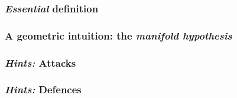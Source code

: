 \subsubsection{\textit{Essential} definition}
\subsubsection{A geometric intuition: the \textit{manifold hypothesis}}
\subsubsection{\textit{Hints:} Attacks}
\subsubsection{\textit{Hints:} Defences}
